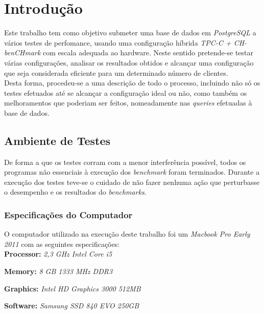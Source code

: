 \section{Introdução}

Este trabalho tem como objetivo submeter uma base de dados em \textit{PostgreSQL} a vários testes de perfomance, usando uma configuração híbrida \textit{TPC-C + CH-benCHmark} com escala adequada ao hardware. Neste sentido pretende-se testar várias configurações, analisar os resultados obtidos e alcançar uma configuração que seja considerada eficiente para um determinado número de clientes.\\

Desta forma, procedeu-se a uma descrição de todo o processo, incluindo não só os testes efetuados até se alcançar a configuração ideal ou não, como também os melhoramentos que poderiam ser feitos, nomeadamente nas \textit{queries} efetuadas à base de dados.\\

\subsection{Ambiente de Testes}

De forma a que os testes corram com a menor interferência possível, todos os programas não essenciais à execução dos \textit{benchmark} foram terminados. Durante a execução dos testes teve-se o cuidado de não fazer nenhuma ação que perturbasse o desempenho e os resultados do \textit{benchmarks}.

\subsubsection{Especificações do Computador}

O computador utilizado na execução deste trabalho foi um \textit{Macbook Pro Early 2011} com as seguintes especificações:\\

\textbf{Processor:} \textit{2,3 GHz Intel Core i5}

\textbf{Memory:} \textit{8 GB 1333 MHz DDR3}

\textbf{Graphics:} \textit{Intel HD Graphics 3000 512MB}

\textbf{Software:} \textit{Samsung SSD 840 EVO 250GB}
